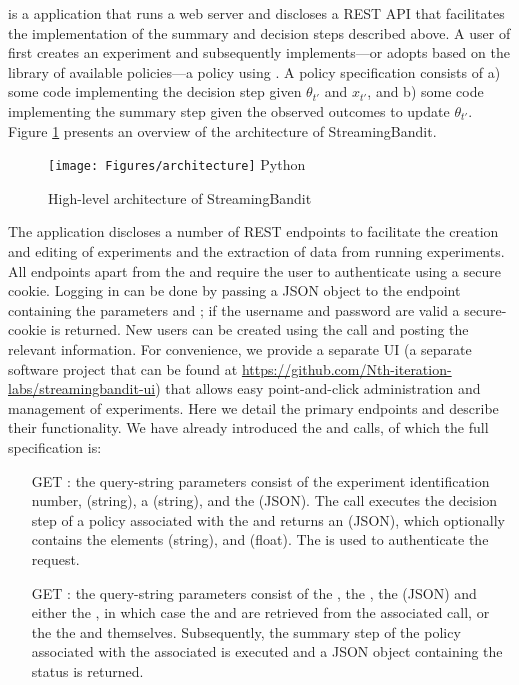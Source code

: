 \documentclass[nojss]{jss}
\begin{document}
 is a  application that runs a  web server \citep{tornado} and discloses a REST API that facilitates the implementation of the summary and decision steps described above. A user of  first creates an experiment and subsequently implements---or adopts based on the library of available policies---a policy using . A policy specification consists of a) some code implementing the decision step given $\theta_{t'}$ and $x_{t'}$, and b) some code implementing the summary step given the observed outcomes to update $\theta_{t'}$. Figure \ref{fig:architect} presents an overview of the architecture of StreamingBandit. 

\begin{figure}[htp]
  \centering
    \texttt{[image: Figures/architecture]}
    \label{fig:1}Python
      \caption{High-level architecture of StreamingBandit}
      \label{fig:architect}
\end{figure}

The application discloses a number of REST endpoints to facilitate the creation and editing of experiments and the extraction of data from running experiments. All endpoints apart from the  and  require the user to authenticate using a secure cookie. Logging in can be done by passing a JSON object to the  endpoint containing the parameters  and ; if the username and password are valid a secure- cookie is returned. New users can be created using the  call and posting the relevant information. For convenience, we provide a separate UI (a separate software project that can be found at \url{https://github.com/Nth-iteration-labs/streamingbandit-ui}) that allows easy point-and-click administration and management of experiments. Here we detail the primary endpoints and describe their functionality. We have already introduced the  and  calls, of which the full specification is:

\begin{itemize}
\item [GET] : the query-string parameters consist of the experiment identification number,  (string), a  (string), and the  (JSON). The call executes the decision step of a policy associated with the  and returns an  (JSON), which optionally contains the elements  (string), and  (float). The  is used to authenticate the request.
\item [GET] : the query-string parameters consist of the , the , the  (JSON) and either the , in which case the  and  are retrieved from the associated  call, or the the  and  themselves. Subsequently, the summary step of the policy associated with the associated  is executed and a JSON object containing the status is returned.
\end{itemize}
\end{document}
